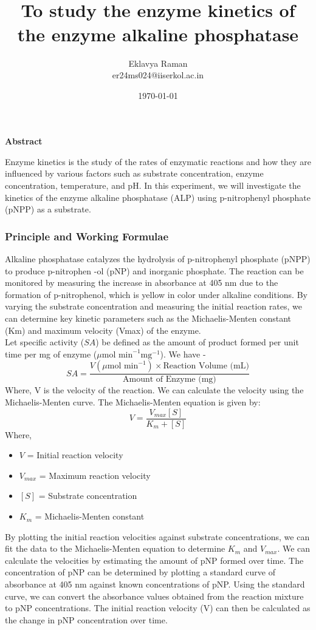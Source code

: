 \documentclass[openany]{book}
\begin{document}
\title{\Large{} \\ \vspace{5pt}
\large{To study the enzyme kinetics of the enzyme alkaline phosphatase}}
\author{Eklavya Raman \\ \vspace{5pt} er24ms024@iiserkol.ac.in \\ \vspace{5pt}}
\date{\today}
\maketitle
\begin{center}
    \textbf{Abstract}
\end{center}
    Enzyme kinetics is the study of the rates of enzymatic reactions and how they are influenced by various factors such as substrate concentration, enzyme concentration, temperature, and pH. In this experiment, we will investigate the kinetics of the enzyme alkaline phosphatase (ALP) using p-nitrophenyl phosphate (pNPP) as a substrate. 
\subsubsection{Principle and Working Formulae}
Alkaline phosphatase catalyzes the hydrolysis of p-nitrophenyl phosphate (pNPP) to produce p-nitrophen -ol (pNP) and inorganic phosphate. The reaction can be monitored by measuring the increase in absorbance at 405 nm due to the formation of p-nitrophenol, which is yellow in color under alkaline conditions. By varying the substrate concentration and measuring the initial reaction rates, we can determine key kinetic parameters such as the Michaelis-Menten constant (Km) and maximum velocity (Vmax) of the enzyme. \\ 
Let specific activity ($SA$) be defined as the amount of product formed per unit time per mg of enzyme ($\mu \text{mol min}^{-1} \text{mg}^{-1}$). We have - 
$$SA = \frac{V (\mu \text{mol min}^{-1}) \times \text{Reaction Volume (mL)}}{\text{Amount of Enzyme (mg)}}$$
Where, V is the velocity of the reaction.
We can calculate the velocity using the Michaelis-Menten curve. The Michaelis-Menten equation is given by:
$$V = \frac{V_{max} [S]}{K_m + [S]}$$
Where,
\begin{itemize}
    \item $V$ = Initial reaction velocity
    \item $V_{max}$ = Maximum reaction velocity
    \item $[S]$ = Substrate concentration
    \item $K_m$ = Michaelis-Menten constant
\end{itemize}
By plotting the initial reaction velocities against substrate concentrations, we can fit the data to the Michaelis-Menten equation to determine $K_m$ and $V_{max}$.
We can calculate the velocities by estimating the amount of pNP formed over time. The concentration of pNP can be determined by plotting a standard curve of absorbance at 405 nm against known concentrations of pNP. Using the standard curve, we can convert the absorbance values obtained from the reaction mixture to pNP concentrations. The initial reaction velocity (V) can then be calculated as the change in pNP concentration over time.
\end{document}
